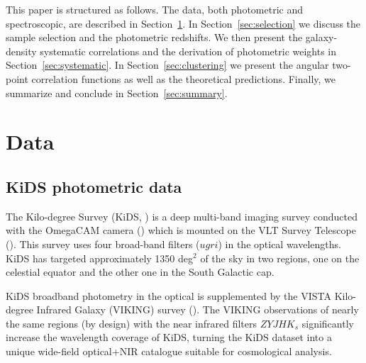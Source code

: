 \documentclass{aa}
\numberwithin{equation}{section}
\begin{document}
This paper is structured as follows. The data, both photometric and spectroscopic, are described in Section~\ref{sec:data}. In Section~\ref{sec:selection} we discuss the sample selection and the photometric redshifts. We then present the galaxy-density systematic correlations and the %
derivation of photometric weights in Section~\ref{sec:systematic}. In Section~\ref{sec:clustering} we present the angular two-point correlation functions as well as the theoretical predictions. Finally, we summarize and conclude in Section~\ref{sec:summary}. 

\section{Data}\label{sec:data}

\subsection{KiDS photometric data}\label{sec:kids}

The Kilo-degree Survey (KiDS, \citealt{kids}) is a deep multi-band imaging survey conducted with the OmegaCAM camera (\citealt{omegacam}) which is mounted on the VLT Survey Telescope (\citealt{vst}). This survey uses four broad-band filters ($ugri$) in the optical wavelengths. KiDS has targeted approximately 1350 deg$^2$ of the sky in two regions, one on the celestial equator and the other one in the South Galactic cap. 

KiDS broadband photometry in the optical is supplemented by the VISTA Kilo-degree Infrared Galaxy (VIKING) survey (\citealt{irwin2004,lewis2010,Edge2013,Gonz2018}). The VIKING observations of nearly the same regions (by design) with the near infrared filters $ZYJHK_{s}$ significantly increase the wavelength coverage of KiDS, turning the KiDS dataset into a unique wide-field optical+NIR catalogue suitable for cosmological analysis.
\end{document}
